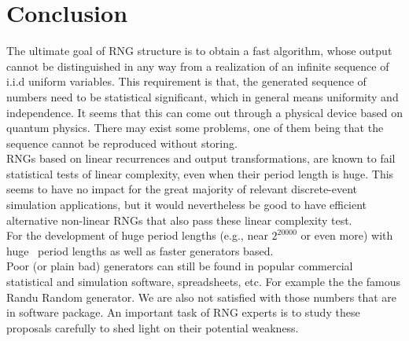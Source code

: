 \documentclass[a4paper,11pt]{article}
\begin{document}
\section{Conclusion}
{
The ultimate goal of RNG structure is to obtain a fast algorithm, whose output cannot 
be distinguished in any way from a realization of an infinite sequence of 
i.i.d uniform variables. This requirement is that, the generated sequence of numbers need to be statistical significant, which 
in general means uniformity and independence. It seems that this can come out through a physical device 
based on quantum physics. There may exist some problems, one of them being that the sequence 
cannot be reproduced without storing.\\
 

RNGs based on linear recurrences and output transformations, 
are known to fail statistical tests of linear 
complexity, even when their period length is 
huge. This seems to have no impact for the great majority of 
relevant discrete-event simulation applications, but it would nevertheless 
be good to have efficient alternative non-linear RNGs that also
pass these linear complexity test. \\

For the development of huge period lengths (e.g., near $2^{20000}$ or even more) with huge \
period lengths as well as faster generators based.\\

Poor (or plain bad) generators can still be found in popular commercial  
statistical and simulation software, spreadsheets, etc. For example the the famous 
Randu Random generator. We are also not satisfied with those numbers that are in software package. An important task
of RNG experts is to study these proposals carefully to shed light on their potential weakness.\\
}


\newpage
{}
\end{document}
